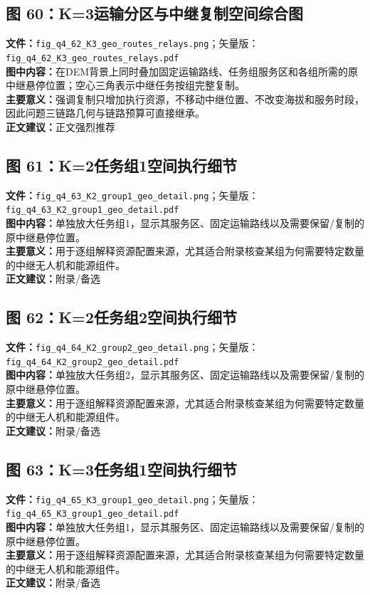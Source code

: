 \subsection*{图 60：K=3运输分区与中继复制空间综合图}
\textbf{文件：}\texttt{fig\_q4\_62\_K3\_geo\_routes\_relays.png}；矢量版：\texttt{fig\_q4\_62\_K3\_geo\_routes\_relays.pdf}\\
\textbf{图中内容：}在DEM背景上同时叠加固定运输路线、任务组服务区和各组所需的原中继悬停位置；空心三角表示中继任务按组完整复制。\\
\textbf{主要意义：}强调复制只增加执行资源，不移动中继位置、不改变海拔和服务时段，因此问题三链路几何与链路预算可直接继承。\\
\textbf{正文建议：}正文强烈推荐

\subsection*{图 61：K=2任务组1空间执行细节}
\textbf{文件：}\texttt{fig\_q4\_63\_K2\_group1\_geo\_detail.png}；矢量版：\texttt{fig\_q4\_63\_K2\_group1\_geo\_detail.pdf}\\
\textbf{图中内容：}单独放大任务组1，显示其服务区、固定运输路线以及需要保留/复制的原中继悬停位置。\\
\textbf{主要意义：}用于逐组解释资源配置来源，尤其适合附录核查某组为何需要特定数量的中继无人机和能源组件。\\
\textbf{正文建议：}附录/备选

\subsection*{图 62：K=2任务组2空间执行细节}
\textbf{文件：}\texttt{fig\_q4\_64\_K2\_group2\_geo\_detail.png}；矢量版：\texttt{fig\_q4\_64\_K2\_group2\_geo\_detail.pdf}\\
\textbf{图中内容：}单独放大任务组2，显示其服务区、固定运输路线以及需要保留/复制的原中继悬停位置。\\
\textbf{主要意义：}用于逐组解释资源配置来源，尤其适合附录核查某组为何需要特定数量的中继无人机和能源组件。\\
\textbf{正文建议：}附录/备选

\subsection*{图 63：K=3任务组1空间执行细节}
\textbf{文件：}\texttt{fig\_q4\_65\_K3\_group1\_geo\_detail.png}；矢量版：\texttt{fig\_q4\_65\_K3\_group1\_geo\_detail.pdf}\\
\textbf{图中内容：}单独放大任务组1，显示其服务区、固定运输路线以及需要保留/复制的原中继悬停位置。\\
\textbf{主要意义：}用于逐组解释资源配置来源，尤其适合附录核查某组为何需要特定数量的中继无人机和能源组件。\\
\textbf{正文建议：}附录/备选

